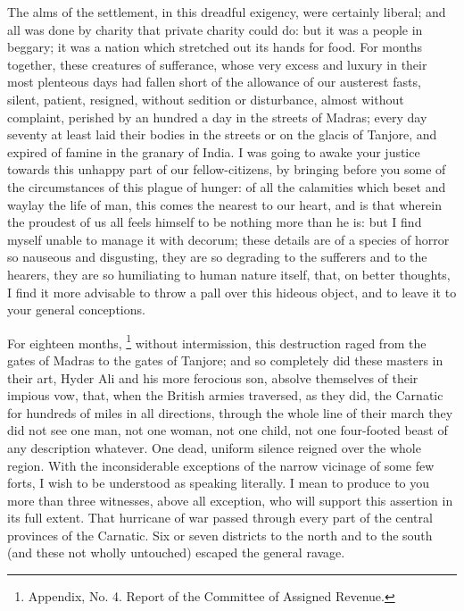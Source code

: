 The alms of the settlement, in this dreadful exigency, were certainly liberal; and all was done by charity that private charity could do: but it was a people in beggary; it was a nation which stretched out its hands for food. For months together, these creatures of sufferance, whose very excess and luxury in their most plenteous days had fallen short of the allowance of our austerest fasts, silent, patient, resigned, without sedition or disturbance, almost without complaint, perished by an hundred a day in the streets of Madras; every day seventy at least laid their bodies in the streets or on the glacis of Tanjore, and expired of famine in the granary of India. I was going to awake your justice towards this unhappy part of our fellow-citizens, by bringing before you some of the circumstances of this plague of hunger: of all the calamities which beset and waylay the life of man, this comes the nearest to our heart, and is that wherein the proudest of us all feels himself to be nothing more than he is: but I find myself unable to manage it with decorum; these details are of a species of horror so nauseous and disgusting, they are so degrading to the sufferers and to the hearers, they are so humiliating to human nature itself, that, on better thoughts, I find it more advisable to throw a pall over this hideous object, and to leave it to your general conceptions.

For eighteen months,
\footnote{ Appendix, No. 4. Report of the Committee of Assigned Revenue.}
 without intermission, this destruction raged from the gates of Madras to the gates of Tanjore; and so completely did these masters in their art, Hyder Ali and his more ferocious son, absolve themselves of their impious vow, that, when the British armies traversed, as they did, the Carnatic for hundreds of miles in all directions, through the whole line of their march they did not see one man, not one woman, not one child, not one four-footed beast of any description whatever. One dead, uniform silence reigned over the whole region. With the inconsiderable exceptions of the narrow vicinage of some few forts, I wish to be understood as speaking literally. I mean to produce to you more than three witnesses, above all exception, who will support this assertion in its full extent. That hurricane of war passed through every part of the central provinces of the Carnatic. Six or seven districts to the north and to the south (and these not wholly untouched) escaped the general ravage.

